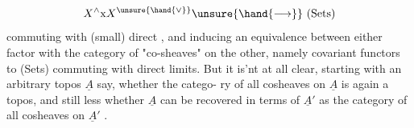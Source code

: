 
\[X^{\wedge}\mathrm{x}X^{\unsure{\hand{\vee}}}\unsure{\hand{\longrightarrow}}\ \text{(Sets)}\]
commuting with (small) direct , and inducing an equivalence between
either factor with the category of  "co-sheaves" on the other, namely
covariant functors to (Sets) commuting with direct limits. But it is'nt
at all clear, starting with an arbitrary topos $\underline{A}$ say, whether the catego-%
ry of all cosheaves on $\underline{A}$ is again a topos, and still less whether $\underline{A}$ can
be recovered in terms of $\underline{A}'$ as the category of all cosheaves on $\underline{A}'$ .

